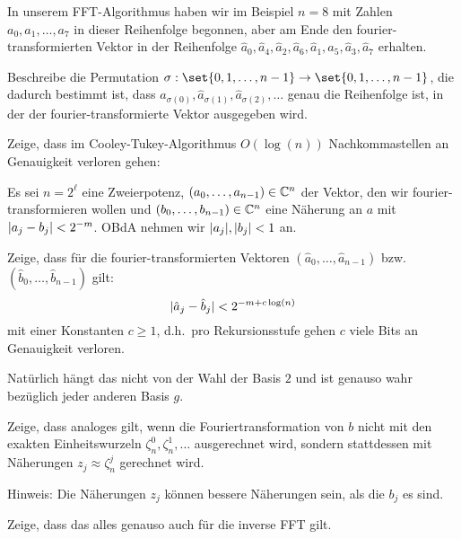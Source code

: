 
\begin{sheet}
    \begin{problem}[title={Eine interessante Permutation}]
        In unserem FFT-Algorithmus haben wir im Beispiel $n=8$ mit Zahlen $a_0,a_1,\ldots,a_7$ in dieser Reihenfolge begonnen, aber am Ende den fourier-transformierten Vektor in der Reihenfolge $\hat{a}_0, \hat{a}_4, \hat{a}_2, \hat{a}_6, \hat{a}_1,\hat{a}_5, \hat{a}_3, \hat{a}_7$ erhalten.

        Beschreibe die Permutation $\sigma:\set{0,1,\ldots,n-1} \to \set{0,1,\ldots,n-1}$, die dadurch bestimmt ist, dass $\hat{a}_{\sigma(0)}, \hat{a}_{\sigma(1)}, \hat{a}_{\sigma(2)}, \ldots$ genau die Reihenfolge ist, in der der fourier-transformierte Vektor ausgegeben wird.
    \end{problem}

    \begin{problem}[title={FFT ist numerisch stabil}]
        Zeige, dass im Cooley-Tukey-Algorithmus $O(\log(n))$ Nachkommastellen an Genauigkeit verloren gehen:

        Es sei $n=2^\ell$ eine Zweierpotenz, $(a_0,\ldots,a_{n-1})\in\mathbb{C}^n$ der Vektor, den wir fourier-transformieren wollen und $(b_0, \ldots, b_{n-1})\in\mathbb{C}^n$ eine Näherung an $a$ mit $\lvert a_j-b_j\rvert < 2^{-m}$. OBdA nehmen wir $\lvert a_j\rvert, \lvert b_j\rvert < 1$ an.

        \begin{subproblem}
            Zeige, dass für die fourier-transformierten Vektoren $(\hat{a}_0,\ldots,\hat{a}_{n-1})$ bzw. $(\hat{b}_0,\ldots,\hat{b}_{n-1})$ gilt:
            \[\lvert\hat{a}_j - \hat{b}_j\rvert < 2^{-m+c\log(n)}\]
            mit einer Konstanten $c\geq 1$, d.h.\ pro Rekursionsstufe gehen $c$ viele Bits an Genauigkeit verloren.
        \end{subproblem}
        \begin{subproblem}
            Natürlich hängt das nicht von der Wahl der Basis $2$ und ist genauso wahr bezüglich jeder anderen Basis $g$.
        \end{subproblem}
        \begin{subproblem}
            Zeige, dass analoges gilt, wenn die Fouriertransformation von $b$ nicht mit den exakten Einheitswurzeln $\zeta_n^0,\zeta_n^1,\ldots$ ausgerechnet wird, sondern stattdessen mit Näherungen $z_j \approx \zeta_n^j$ gerechnet wird.

            Hinweis: Die Näherungen $z_j$ können bessere Näherungen sein, als die $b_j$ es sind.
        \end{subproblem}
        \begin{subproblem}
            Zeige, dass das alles genauso auch für die inverse FFT gilt.
        \end{subproblem}
    \end{problem}


\end{sheet}
